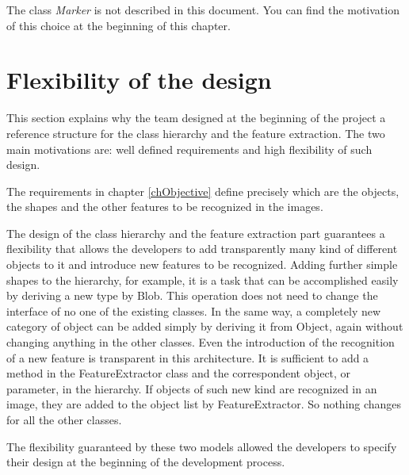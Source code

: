 	The class \emph{Marker} is not described in this document. You can find the motivation of this choice at the beginning of this chapter.


	\section{Flexibility of the design}			
	This section explains why the team designed at the beginning of the project a reference structure for the class hierarchy and the feature extraction. The two main motivations are: well defined requirements and high flexibility of such design. %
	
	The requirements in chapter \ref{chObjective} define precisely which are the objects, the shapes and the other features to be recognized in the images.

	The design of the class hierarchy and the feature extraction part guarantees a flexibility that allows the developers to add transparently many kind of different objects to it and introduce new features to be recognized.
	Adding further simple shapes to the hierarchy, for example, it is a task that can be accomplished easily by deriving a new type by Blob. This operation does not need to change the interface of no one of the existing classes.
	In the same way, a completely new category of object can be added simply by deriving it from Object, again without changing anything in the other classes. 
	Even the introduction of the recognition of a new feature is transparent in this architecture. It is sufficient to add a method in the FeatureExtractor class and the correspondent object, or parameter, in the hierarchy. If objects of such new kind are recognized in an image, they are added to the object list by FeatureExtractor. So nothing changes for all the other classes.

	The flexibility guaranteed by these two models allowed the developers to specify their design at the beginning of the development process.

